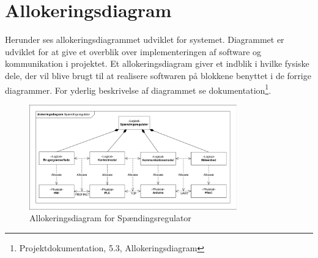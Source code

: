 

\section{Allokeringsdiagram}

Herunder ses allokeringsdiagrammet udviklet for systemet. Diagrammet er udviklet for at give et overblik over implementeringen af software og kommunikation i projektet. Et allokeringsdiagram giver et indblik i hvilke fysiske dele, der vil blive brugt til at realisere softwaren på blokkene benyttet i de forrige diagrammer. For yderlig beskrivelse af diagrammet se dokumentation\footnote{Projektdokumentation, 5.3, Allokeringsdiagram}.


\begin{figure}[htbp] %
	\centering
	\includegraphics[width=0.8\textwidth]{figure/Allokering.pdf}
	\caption{Allokeringsdiagram for Spændingsregulator}
	\label{fig:Allokering}
\end{figure}
